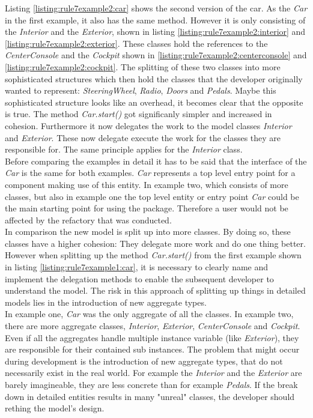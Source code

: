 Listing \ref{listing:rule7example2:car} shows the second version of the car. As the \textit{Car} in the first example, it also has the same method. However it is only consisting of the \textit{Interior} and the \textit{Exterior}, shown in listing \ref{listing:rule7example2:interior} and \ref{listing:rule7example2:exterior}. These classes hold the references to the \textit{CenterConsole} and the \textit{Cockpit} shown in \ref{listing:rule7example2:centerconsole} and \ref{listing:rule7example2:cockpit}. The splitting of these two classes into more sophisticated structures which then hold the classes that the developer originally wanted to represent: \textit{SteeringWheel}, \textit{Radio}, \textit{Doors} and \textit{Pedals}. Maybe this sophisticated structure looks like an overhead,  it becomes clear that the opposite is true. The method \textit{Car.start()} got significanly simpler and increased in cohesion. Furthermore it now delegates the work to the model classes \textit{Interior} and \textit{Exterior}. These now delegate execute the work for the classes they are responsible for. The same principle applies for the \textit{Interior} class. 
\\

Before comparing the examples in detail it has to be said that the interface of the \textit{Car} is the same for both examples. \textit{Car} represents a top level entry point for a component making use of this entity. In example two, which consists of more classes, but also in example one the top level entity or entry point \textit{Car} could be the main starting point for using the package. Therefore a user would not be affected by the refactory that was conducted. 
\\

In comparison the new model is split up into more classes. By doing so, these classes have a higher cohesion: They delegate more work and do one thing better. However when splitting up the method \textit{Car.start()} from the first example shown in listing \ref{listing:rule7example1:car}, it is necessary to clearly name and implement the delegation methods to enable the subsequent developer to understand the model. The risk in this approach of splitting up things in detailed models lies in the introduction of new aggregate types. 
\\

In example one, \textit{Car} was the only aggregate of all the classes. In example two, there are more aggregate classes, \textit{Interior}, \textit{Exterior}, \textit{CenterConsole} and \textit{Cockpit}. Even if all the aggregates handle multiple instance variable (like \textit{Exterior}), they are responsible for their contained sub instances. The problem that might occur during development is the introduction of new aggregate types, that do not necessarily exist in the real world. For example the \textit{Interior} and the \textit{Exterior} are barely imagineable, they are less concrete than for example \textit{Pedals}. If the break down in detailed entities results in many "unreal" classes, the developer should rething the model's design. 
\\

